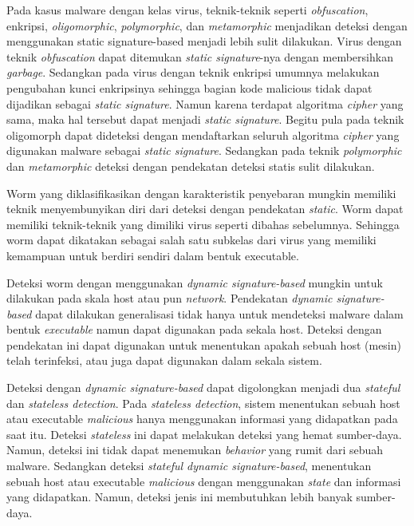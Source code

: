 Pada kasus malware dengan kelas virus, teknik-teknik seperti \textit{obfuscation}, enkripsi, \textit{oligomorphic}, \textit{polymorphic}, dan \textit{metamorphic} menjadikan deteksi dengan menggunakan static signature-based menjadi lebih sulit dilakukan.  Virus dengan teknik \textit{obfuscation} dapat ditemukan \textit{static signature}-nya dengan membersihkan \textit{garbage}. Sedangkan pada virus dengan teknik enkripsi umumnya melakukan pengubahan kunci enkripsinya sehingga bagian kode malicious tidak dapat dijadikan sebagai \textit{static signature}. Namun karena terdapat algoritma \textit{cipher} yang sama, maka hal tersebut dapat menjadi \textit{static signature}. Begitu pula pada teknik oligomorph dapat dideteksi dengan mendaftarkan seluruh algoritma \textit{cipher} yang digunakan malware sebagai \textit{static signature}. Sedangkan pada teknik \textit{polymorphic} dan \textit{metamorphic} deteksi dengan pendekatan deteksi statis sulit dilakukan.

Worm yang diklasifikasikan dengan karakteristik penyebaran mungkin memiliki teknik menyembunyikan diri dari deteksi dengan pendekatan \textit{static}. Worm dapat memiliki teknik-teknik yang dimiliki virus seperti dibahas sebelumnya. Sehingga worm dapat dikatakan sebagai salah satu subkelas dari virus yang memiliki kemampuan untuk berdiri sendiri dalam bentuk executable.

Deteksi worm dengan menggunakan \textit{dynamic signature-based} mungkin untuk dilakukan pada skala host atau pun \textit{network}. Pendekatan \textit{dynamic signature-based} dapat dilakukan generalisasi tidak hanya untuk mendeteksi malware dalam bentuk \textit{executable} namun dapat digunakan pada sekala host. Deteksi dengan pendekatan ini dapat digunakan untuk menentukan apakah sebuah host (mesin) telah terinfeksi, atau juga dapat digunakan dalam sekala sistem. 

Deteksi dengan \textit{dynamic signature-based} dapat digolongkan menjadi dua \textit{stateful} dan \textit{stateless detection}. Pada \textit{stateless detection}, sistem menentukan sebuah host atau executable \textit{malicious} hanya menggunakan informasi yang didapatkan pada saat itu. Deteksi \textit{stateless} ini dapat melakukan deteksi yang hemat sumber-daya. Namun, deteksi ini tidak dapat menemukan \textit{behavior} yang rumit dari sebuah malware. Sedangkan deteksi \textit{stateful dynamic signature-based}, menentukan sebuah host atau executable \textit{malicious} dengan menggunakan \textit{state} dan informasi yang didapatkan. Namun, deteksi jenis ini membutuhkan lebih banyak sumber-daya.

